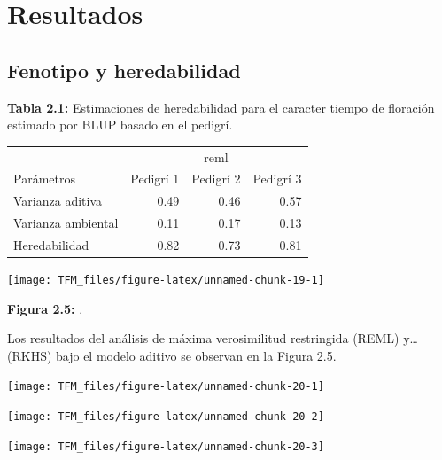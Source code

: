 \documentclass[11pt,spanish,a4paper,oneside,]{book} %
\begin{document}
\hypertarget{results2}{%
\section{Resultados}\label{results2}}

\hypertarget{fenotipo-y-heredabilidad}{%
\subsection{Fenotipo y heredabilidad}\label{fenotipo-y-heredabilidad}}

\begin{center}
\textbf{Tabla 2.1:} Estimaciones de heredabilidad para el caracter tiempo de floración estimado por BLUP basado en el pedigrí.

\end{center}

\captionsetup[table]{labelformat=empty,skip=1pt}
\begin{longtable}{lrrr}
\toprule
 & \multicolumn{3}{c}{reml} \\ 
 \cmidrule(lr){2-4}
Parámetros & Pedigrí 1 & Pedigrí 2 & Pedigrí 3 \\ 
\midrule
Varianza aditiva & 0.49 & 0.46 & 0.57 \\ 
Varianza ambiental & 0.11 & 0.17 & 0.13 \\ 
Heredabilidad & 0.82 & 0.73 & 0.81 \\ 
 \bottomrule
\end{longtable}

\begin{center}\texttt{[image: TFM\_files/figure-latex/unnamed-chunk-19-1]} \end{center}

\begin{center}
\textbf{Figura 2.5:} .

\end{center}

Los resultados del análisis de máxima verosimilitud restringida (REML) y\ldots{} (RKHS) bajo el modelo aditivo se observan en la Figura 2.5.

\begin{center}\texttt{[image: TFM\_files/figure-latex/unnamed-chunk-20-1]} \end{center}

\begin{center}\texttt{[image: TFM\_files/figure-latex/unnamed-chunk-20-2]} \end{center}

\begin{center}\texttt{[image: TFM\_files/figure-latex/unnamed-chunk-20-3]} \end{center}
\end{document}
